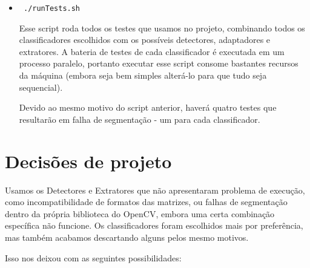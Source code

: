 \documentclass[a4paper,11pt]{article}
\begin{document}
\begin{itemize}
      \item \verb| ./runTests.sh|

      Esse script roda todos os testes que usamos no projeto, combinando todos
      os classificadores escolhidos com os possíveis detectores, adaptadores e
      extratores. A bateria de testes de cada classificador é executada em um
      processo paralelo, portanto executar esse script consome bastantes
      recursos da máquina (embora seja bem simples alterá-lo para que tudo seja
      sequencial).

      Devido ao mesmo motivo do script anterior, haverá quatro testes que
      resultarão em falha de segmentação - um para cada classificador.
    \end{itemize}

\section{Decisões de projeto}

  Usamos os Detectores e Extratores que não apresentaram problema de execução,
  como incompatibilidade de formatos das matrizes, ou falhas de segmentação
  dentro da própria biblioteca do OpenCV, embora uma certa combinação específica
  não funcione. Os classificadores foram escolhidos mais por preferência, mas
  também acabamos descartando alguns pelos mesmo motivos.  

  Isso nos deixou com as seguintes possibilidades:
\end{document}
